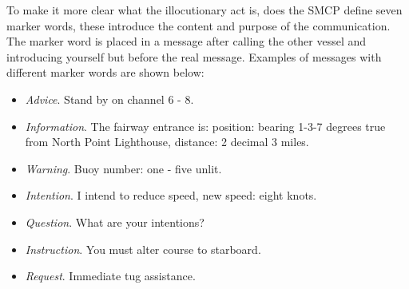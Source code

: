 To make it more clear what the illocutionary act is, does the \ac{SMCP} define seven marker words, these introduce the content and purpose of the communication. The marker word is placed in a message after calling the other vessel and introducing yourself but before the real message. Examples of messages with different marker words are shown below:
\begin{itemize}
	\item \emph{Advice}. Stand by on channel 6 - 8.
	\item \emph{Information}. The fairway entrance is: position: bearing 1-3-7 degrees true from North Point Lighthouse, distance: 2 decimal 3 miles.
	\item \emph{Warning}. Buoy number: one - five unlit.
	\item \emph{Intention}. I intend to reduce speed, new speed: eight knots.
	\item \emph{Question}. What are your intentions?
	\item \emph{Instruction}. You must alter course to starboard.
	\item \emph{Request}. Immediate tug assistance.
\end{itemize}
